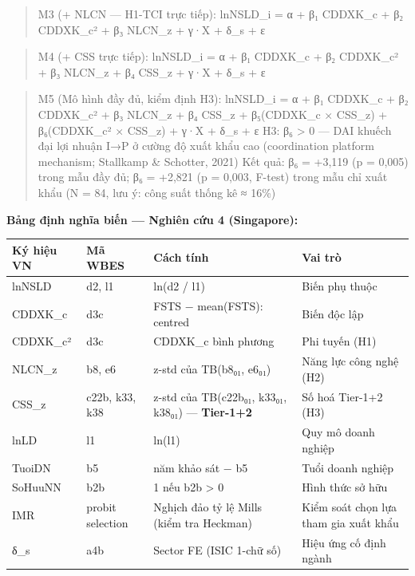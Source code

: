 \documentclass[12pt,a4paper]{article}
\begin{document}
\begin{quote}
M3 (+ NLCN --- H1-TCI trực tiếp): lnNSLD\_i = α + β₁ CDDXK\_c + β₂
CDDXK\_c² + β₃ NLCN\_z + γ·X + δ\_s + ε
\end{quote}

\begin{quote}
M4 (+ CSS trực tiếp): lnNSLD\_i = α + β₁ CDDXK\_c + β₂ CDDXK\_c² + β₃
NLCN\_z + β₄ CSS\_z + γ·X + δ\_s + ε
\end{quote}

\begin{quote}
M5 (Mô hình đầy đủ, kiểm định H3): lnNSLD\_i = α + β₁ CDDXK\_c + β₂
CDDXK\_c² + β₃ NLCN\_z + β₄ CSS\_z + β₅(CDDXK\_c × CSS\_z) +
β₆(CDDXK\_c² × CSS\_z) + γ·X + δ\_s + ε H3: β₆ \textgreater{} 0 --- DAI
khuếch đại lợi nhuận I→P ở cường độ xuất khẩu cao (coordination platform
mechanism; Stallkamp \& Schotter, 2021) Kết quả: β₆ = +3,119 (p = 0,005)
trong mẫu đầy đủ; β₆ = +2,821 (p = 0,003, F-test) trong mẫu chỉ xuất
khẩu (N = 84, lưu ý: công suất thống kê ≈ 16\%)
\end{quote}

\textbf{Bảng định nghĩa biến --- Nghiên cứu 4 (Singapore):}

\begin{longtable}[]{@{}llll@{}}
\toprule\noalign{}
Ký hiệu VN & Mã WBES & Cách tính & Vai trò \\
\midrule\noalign{}
\endhead
\bottomrule\noalign{}
\endlastfoot
lnNSLD & d2, l1 & ln(d2 / l1) & Biến phụ thuộc \\
CDDXK\_c & d3c & FSTS − mean(FSTS): centred & Biến độc lập \\
CDDXK\_c² & d3c & CDDXK\_c bình phương & Phi tuyến (H1) \\
NLCN\_z & b8, e6 & z-std của TB(b8₀₁, e6₀₁) & Năng lực công nghệ (H2) \\
CSS\_z & c22b, k33, k38 & z-std của TB(c22b₀₁, k33₀₁, k38₀₁) ---
\textbf{Tier-1+2} & Số hoá Tier-1+2 (H3) \\
lnLD & l1 & ln(l1) & Quy mô doanh nghiệp \\
TuoiDN & b5 & năm khảo sát − b5 & Tuổi doanh nghiệp \\
SoHuuNN & b2b & 1 nếu b2b \textgreater{} 0 & Hình thức sở hữu \\
IMR & probit selection & Nghịch đảo tỷ lệ Mills (kiểm tra Heckman) &
Kiểm soát chọn lựa tham gia xuất khẩu \\
δ\_s & a4b & Sector FE (ISIC 1-chữ số) & Hiệu ứng cố định ngành \\
\end{longtable}
\end{document}
